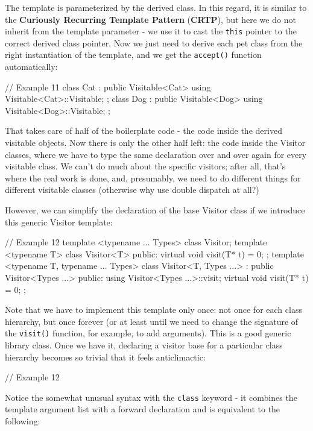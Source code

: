 The template is parameterized by the derived class. In this regard, it is similar to the \textbf{Curiously Recurring Template Pattern} (\textbf{CRTP}), but here we do not inherit from the template parameter - we use it to cast the \texttt{this} pointer to the correct derived class pointer. Now we just need to derive each pet class from the right instantiation of the template, and we get the \texttt{accept()} function automatically:

\begin{code}
// Example 11
class Cat : public Visitable<Cat> {
  using Visitable<Cat>::Visitable;
};
class Dog : public Visitable<Dog> {
  using Visitable<Dog>::Visitable;
};
\end{code}

That takes care of half of the boilerplate code - the code inside the derived visitable objects. Now there is only the other half left: the code inside the Visitor classes, where we have to type the same declaration over and over again for every visitable class. We can't do much about the specific visitors; after all, that's where the real work is done, and, presumably, we need to do different things for different visitable classes (otherwise why use double dispatch at all?)

However, we can simplify the declaration of the base Visitor class if we introduce this generic Visitor template:

\begin{code}
// Example 12
template <typename ... Types> class Visitor;
template <typename T> class Visitor<T> {
  public:
  virtual void visit(T* t) = 0;
};
template <typename T, typename ... Types>
class Visitor<T, Types ...> : public Visitor<Types ...> {
  public:
  using Visitor<Types ...>::visit;
  virtual void visit(T* t) = 0;
};
\end{code}

Note that we have to implement this template only once: not once for each class hierarchy, but once forever (or at least until we need to change the signature of the \texttt{visit()} function, for example, to add arguments). This is a good generic library class. Once we have it, declaring a visitor base for a particular class hierarchy becomes so trivial that it feels anticlimactic:

\begin{code}
// Example 12
\end{code}

Notice the somewhat unusual syntax with the \texttt{class} keyword - it combines the template argument list with a forward declaration and is equivalent to the following:

